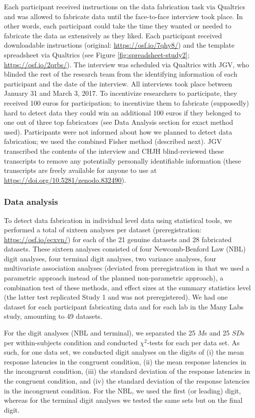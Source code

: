 \documentclass[a5paper]{book}
\begin{document}
Each participant received instructions on the data fabrication task via
Qualtrics and was allowed to fabricate data until the face-to-face
interview took place. In other words, each participant could take the
time they wanted or needed to fabricate the data as extensively as they
liked. Each participant received downloadable instructions (original:
\url{https://osf.io/7qhy8/}) and the template spreadsheet via Qualtrics
(see Figure \ref{fig:spreadsheet-study2}; \url{https://osf.io/2qrbs/}).
The interview was scheduled via Qualtrics with JGV, who blinded the rest
of the research team from the identifying information of each
participant and the date of the interview. All interviews took place
between January 31 and March 3, 2017. To incentivize researchers to
participate, they received 100 euros for participation; to incentivize
them to fabricate (supposedly) hard to detect data they could win an
additional 100 euros if they belonged to one out of three top
fabricators (see Data Analysis section for exact method used).
Participants were not informed about how we planned to detect data
fabrication; we used the combined Fisher method (described next). JGV
transcribed the contents of the interview and CHJH blind-reviewed these
transcripts to remove any potentially personally identifiable
information (these transcripts are freely available for anyone to use at
\url{https://doi.org/10.5281/zenodo.832490}).

\subsubsection{Data analysis}\label{data-analysis-1}

To detect data fabrication in individual level data using statistical
tools, we performed a total of sixteen analyses per dataset
(preregistration: \url{https://osf.io/ecxvn/}) for each of the 21
genuine datasets and 28 fabricated datasets. These sixteen analyses
consisted of four Newcomb-Benford Law (NBL) digit analyses, four
terminal digit analyses, two variance analyses, four multivariate
association analyses (deviated from preregistration in that we used a
parametric approach instead of the planned non-parametric approach), a
combination test of these methods, and effect sizes at the summary
statistics level (the latter test replicated Study 1 and was not
preregistered). We had one dataset for each participant fabricating data
and for each lab in the Many Labs study, amounting to 49 datasets.

For the digit analyses (NBL and terminal), we separated the 25 \(M\)s
and 25 \(SD\)s per within-subjects condition and conducted
\(\chi^2\)-tests for each per data set. As such, for one data set, we
conducted digit analyses on the digits of (i) the mean response
latencies in the congruent condition, (ii) the mean response latencies
in the incongruent condition, (iii) the standard deviation of the
response latencies in the congruent condition, and (iv) the standard
deviation of the response latencies in the incongruent condition. For
the NBL, we used the first (or leading) digit, whereas for the terminal
digit analyses we tested the same sets but on the final digit.
\end{document}
